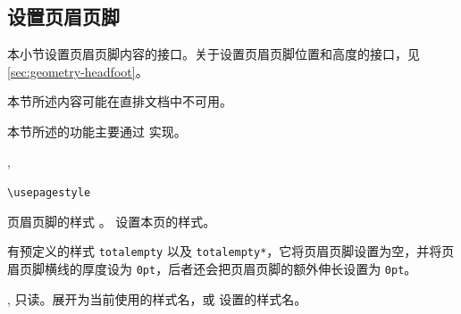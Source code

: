 \documentclass{cusdoc}
\begin{document}




\subsection{设置页眉页脚}\label{sec:pagestyle}

本小节设置页眉页脚内容的接口。关于设置页眉页脚位置和高度的接口，见\cref{sec:geometry-headfoot}。

本节所述内容可能在直排文档中不可用。

本节所述的功能主要通过  实现。

\begin{function}{\usepagestyle, \usethispagestyle}
  \begin{syntax}
    \verb|\usepagestyle| 
  \end{syntax}
 页眉页脚的样式 。 设置本页的样式。

有预定义的样式 \texttt{totalempty} 以及 \texttt{totalempty*}，它将页眉页脚设置为空，并将页眉页脚横线的厚度设为 \texttt{0pt}，后者还会把页眉页脚的额外伸长设置为 \texttt{0pt}。
\end{function}

\begin{function}[EXP]{\@currpagestyle, \@specialstyle}
只读。展开为当前使用的样式名，或  设置的样式名。
\end{function}
\end{document}
